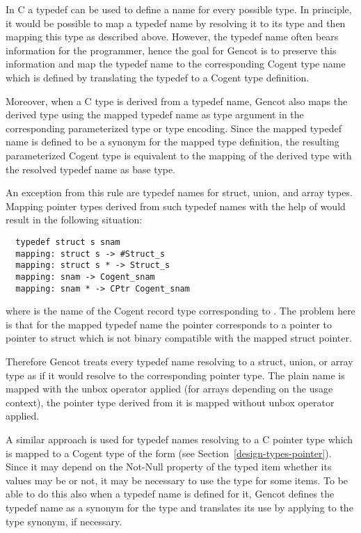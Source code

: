 In C a typedef can be used to define a name for every possible type. In principle, it would be possible to
map a typedef name by resolving it to its type and then mapping this type as described above. However, the
typedef name often bears information for the programmer, hence the goal for Gencot is to preserve this information
and map the typedef name to the corresponding Cogent type name which is defined by translating the typedef
to a Cogent type definition.

Moreover, when a C type is derived from a typedef name, Gencot also maps the derived type using the mapped typedef name
as type argument in the corresponding parameterized type or type encoding. Since the mapped typedef name is defined to be a synonym 
for the mapped type definition, the resulting parameterized Cogent type is equivalent to the mapping of the derived 
type with the resolved typedef name as base type.

An exception from this rule are typedef names for struct, union, and array types. Mapping pointer types derived 
from such typedef names with the help of  would result in the following situation:
\begin{verbatim}
  typedef struct s snam
  mapping: struct s -> #Struct_s
  mapping: struct s * -> Struct_s
  mapping: snam -> Cogent_snam
  mapping: snam * -> CPtr Cogent_snam
\end{verbatim}
where  is the name of the Cogent record type corresponding to . The problem here
is that for the mapped typedef name the pointer corresponds to a pointer to pointer to struct which is not binary 
compatible with the mapped struct pointer.

Therefore Gencot treats every typedef name resolving to a struct, union, or array type as if 
it would resolve to the corresponding pointer type. The plain name is mapped with the unbox operator 
applied (for arrays depending on the usage context), the pointer type derived from it is mapped without 
unbox operator applied. 

A similar approach is used for typedef names resolving to a C pointer type which is mapped to a Cogent type of the 
form  (see Section~\ref{design-types-pointer}). Since it may depend on the Not-Null property of the 
typed item whether its values may be  or not, it may be necessary to use the type  for some items.
To be able to do this also when a typedef name is defined for it, Gencot defines the typedef name as a synonym 
for the type  and translates its use by applying  to the type synonym, if necessary.

